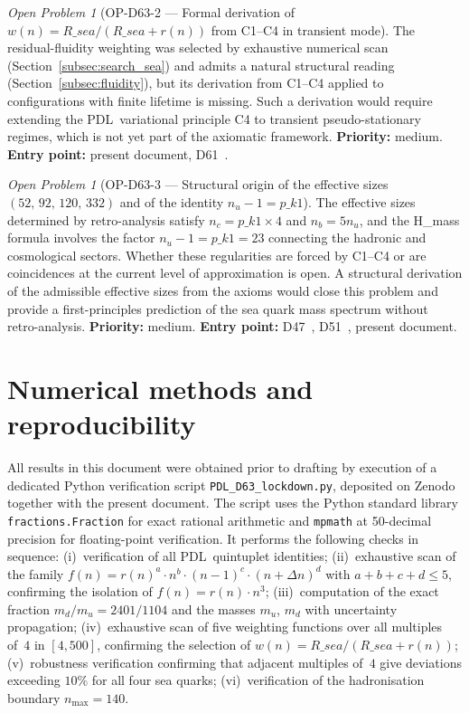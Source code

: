 \documentclass[12pt,a4paper]{article}
\def\PDL{PDL}
\def\Rsea{R\_sea}
\def\pkone{p\_k1}
\theoremstyle{plain}
\theoremstyle{definition}
\theoremstyle{remark}
\newtheorem{openproblem}[theorem]{Open Problem}
\newcommand{\PDL}{\textnormal{PDL}}
\newcommand{\nnu}{n_u}
\newcommand{\Dn}{\Delta n}
\newcommand{\Rsea}{R_{\mathrm{sea}}}
\newcommand{\pkone}{p_{k_1}}
\newcommand{\mup}{m_u}
\newcommand{\mdown}{m_d}
\begin{document}
\begin{openproblem}[\texorpdfstring{OP-D63-2 --- Formal derivation of $w(n) = \Rsea/(\Rsea + r(n))$ from C1--C4 in transient mode}{OP-D63-2 --- Formal derivation of the fluidity weighting}]
\label{op:2}
The residual-fluidity weighting was selected by exhaustive numerical scan (Section~\ref{subsec:search_sea}) and admits a natural structural reading (Section~\ref{subsec:fluidity}), but its derivation from C1--C4 applied to configurations with finite lifetime is missing. Such a derivation would require extending the \PDL\ variational principle C4 to transient pseudo-stationary regimes, which is not yet part of the axiomatic framework. \textbf{Priority:} medium. \textbf{Entry point:} present document, D61~\cite{D61}.
\end{openproblem}

\begin{openproblem}[OP-D63-3 --- Structural origin of the effective sizes $(52,\,92,\,120,\,332)$ and of the identity $\nnu - 1 = \pkone$]
\label{op:3}
The effective sizes determined by retro-analysis satisfy $n_c = \pkone \times 4$ and $n_b = 5\nnu$, and the H\_mass formula involves the factor $\nnu - 1 = \pkone = 23$ connecting the hadronic and cosmological sectors. Whether these regularities are forced by C1--C4 or are coincidences at the current level of approximation is open. A structural derivation of the admissible effective sizes from the axioms would close this problem and provide a first-principles prediction of the sea quark mass spectrum without retro-analysis. \textbf{Priority:} medium. \textbf{Entry point:} D47~\cite{D47}, D51~\cite{D51}, present document.
\end{openproblem}

\section{Numerical methods and reproducibility}
\label{sec:methods}

All results in this document were obtained prior to drafting by execution of a dedicated Python verification script \texttt{PDL\_D63\_lockdown.py}, deposited on Zenodo together with the present document. The script uses the Python standard library \texttt{fractions.Fraction} for exact rational arithmetic and \texttt{mpmath} at 50-decimal precision for floating-point verification. It performs the following checks in sequence: (i)~verification of all \PDL\ quintuplet identities; (ii)~exhaustive scan of the family $f(n) = r(n)^a \cdot n^b \cdot (n-1)^c \cdot (n+\Dn)^d$ with $a+b+c+d \leq 5$, confirming the isolation of $f(n) = r(n) \cdot n^3$; (iii)~computation of the exact fraction $\mdown/\mup = 2401/1104$ and the masses $\mup$, $\mdown$ with uncertainty propagation; (iv)~exhaustive scan of five weighting functions over all multiples of~$4$ in $[4, 500]$, confirming the selection of $w(n) = \Rsea/(\Rsea + r(n))$; (v)~robustness verification confirming that adjacent multiples of~$4$ give deviations exceeding $10\%$ for all four sea quarks; (vi)~verification of the hadronisation boundary $n_{\max} = 140$.
\end{document}
